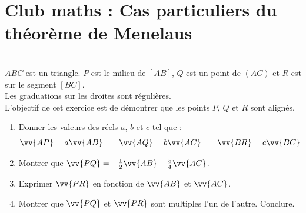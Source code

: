 \documentclass[main.tex]{subfiles}
\begin{document}
\section{Club maths : Cas particuliers du théorème de Menelaus}
\begin{exercise}\hfill \\
$ABC$ est un triangle. $P$ est le milieu de $[AB]$, $Q$ est un point de $(AC)$ et $R$ est sur le segment $[BC]$.\\
Les graduations sur les droites sont régulières.\\
L'objectif de cet exercice est de démontrer que les points $P$, $Q$ et $R$ sont alignés.\\
\begin{minipage}{0.5\columnwidth} 
\begin{enumerate}
\item Donner les valeurs des réels $a$, $b$ et $c$ tel que :
\[
\vv{AP}=a\vv{AB}\qquad \vv{AQ}=b\vv{AC}\qquad \vv{BR}=c\vv{BC}
\]
\item Montrer que $\vv{PQ}=-\tfrac{1}{2}\vv{AB}+\tfrac{5}{4}\vv{AC}$.
\item Exprimer $\vv{PR}$ en fonction de $\vv{AB}$ et $\vv{AC}$.
\item Montrer que $\vv{PQ}$ et $\vv{PR}$ sont multiples l'un de l'autre. Conclure.
\end{enumerate}
\end{minipage}
\begin{minipage}{0.5\columnwidth}\centering
{}
\end{minipage}

\end{exercise}  
%
%
\end{document}
